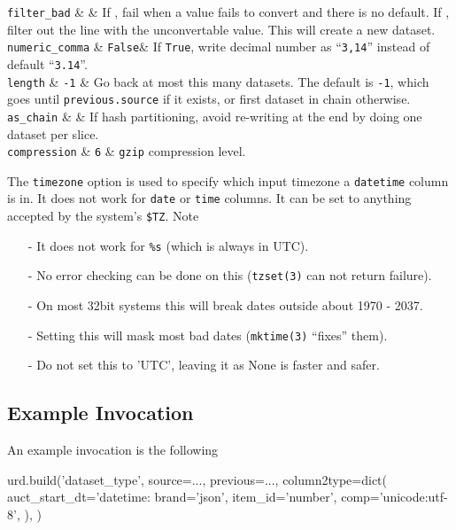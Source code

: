   \pagebreak
  \RP \texttt{filter\_bad} & \pyFalse & If \pyFalse, fail when a value
  fails to convert and there is no default.  If \pyTrue, filter out
  the line with the unconvertable value.  This will create a new dataset.\\

  \RP \texttt{numeric\_comma} & \texttt{False}&
  If \texttt{True}, write decimal number as
  ``\texttt{3,14}'' instead of default ``\texttt{3.14}''.\\

  \RP \texttt{length} & \texttt{-1} & Go back at most this many
  datasets. The default is \texttt{-1}, which goes
  until \texttt{previous.source} if it exists, or first dataset in
  chain otherwise.\\

  \RP \texttt{as\_chain} & \pyFalse & If hash partitioning, avoid
  re-writing at the end by doing one dataset per slice.\\

  \RP \texttt{compression} & \texttt{6} & \texttt{gzip} compression level.\\
\stoptable

\noindent The \texttt{timezone} option is used to specify which input
timezone a \texttt{datetime} column is in.  It does not work for
\texttt{date} or \texttt{time} columns.  It can be set to anything
accepted by the system's \texttt{\$TZ}.  Note
\begin{itemize}
\item[-] It does not work for \texttt{\%s} (which is always in UTC).
\item[-] No error checking can be done on this (\texttt{tzset(3)} can not return failure).
\item[-] On most 32bit systems this will break dates outside about 1970 - 2037.
\item[-] Setting this will mask most bad dates (\texttt{mktime(3)} ``fixes'' them).
\item[-] Do not set this to 'UTC', leaving it as None is faster and safer.
\end{itemize}



\subsection{Example Invocation}
An example invocation is the following
\begin{python}
urd.build('dataset_type',
    source=...,
    previous=...,
    column2type=dict(
        auct_start_dt='datetime:%
        brand='json',
        item_id='number',
        comp='unicode:utf-8',
    ),
)
\end{python}



